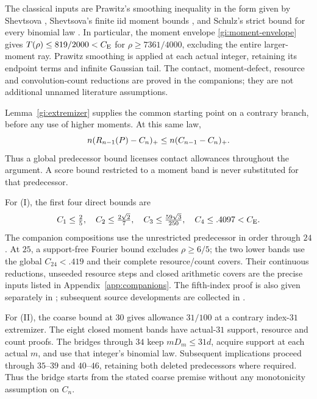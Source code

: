 The classical inputs are Prawitz's smoothing inequality \cite{Prawitz1972} in the form
given by Shevtsova \cite[Lemma~4.1, p.~263]{Shevtsova2012},
Shevtsova's finite iid moment bounds \cite{Shevtsova2013}, and
Schulz's strict bound for every binomial law \cite[Theorem~1]{Schulz2016}.
In particular, the moment envelope \eqref{gi:moment-envelope} gives
$T(\rho)\le819/2000<C_{\mathrm E}$ for $\rho\ge7361/4000$,
excluding the entire larger-moment ray.
Prawitz smoothing is applied at each actual integer, retaining its
endpoint terms and infinite Gaussian tail. The contact, moment-defect,
resource and convolution-count reductions are proved in the companions;
they are not additional unnamed literature assumptions.

Lemma~\ref{gi:extremizer} supplies the common starting point on a
contrary branch, before any use of higher moments. At this same law,
\begin{equation}\label{gi:predecessor}
 n(R_{n-1}(P)-C_n)_+\le n(C_{n-1}-C_n)_+.
\end{equation}
Thus a global predecessor bound licenses contact allowances throughout
the argument. A score bound restricted to a moment band is never
substituted for that predecessor.

For (I), the first four direct bounds are
\[
 C_1\le\tfrac25,\quad C_2\le\tfrac{2\sqrt2}{7},\quad
 C_3\le\tfrac{59\sqrt3}{250},\quad C_4\le.4097<C_{\mathrm E}.
\]
The companion compositions use the unrestricted predecessor in order
through $24$. At $25$, a support-free Fourier bound excludes
$\rho\ge6/5$; the two lower bands use the global $C_{24}<.419$
and their complete resource/count covers. Their continuous reductions,
unseeded resource steps and closed arithmetic covers are the precise
inputs listed in Appendix~\ref{app:companions}. The fifth-index proof
is also given separately in \cite{RKFive2026}; subsequent source
developments are collected in \cite{RKSources2026}.


For (II), the coarse bound at $30$ gives allowance $31/100$ at
a contrary index-$31$ extremizer. The eight closed moment bands have
actual-$31$ support, resource and count proofs. The bridges through
$34$ keep $mD_m\le31d$, acquire support at each actual $m$, and use
that integer's binomial law. Subsequent implications proceed through
$35$--$39$ and $40$--$46$, retaining both deleted predecessors where
required. Thus the bridge starts from the stated coarse premise
without any monotonicity assumption on $C_n$.

